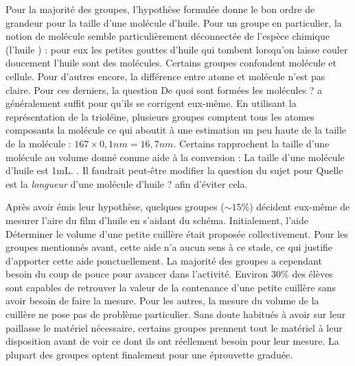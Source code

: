 \documentclass[12pt,a4paper]{article}
\begin{document}
Pour la majorité des groupes, l'hypothèse formulée donne le bon ordre de grandeur pour la taille d'une molécule d'huile.
Pour un groupe en particulier, la notion de molécule semble particulièrement déconnectée de l'espèce chimique (\og l'huile \fg{}) : pour eux les petites gouttes d'huile qui tombent lorsqu'on laisse couler doucement l'huile sont des molécules.
Certains groupes confondent molécule et cellule.
Pour d'autres encore, la différence entre atome et molécule n'est pas claire.
Pour ces derniers, la question \og De quoi sont formées les molécules ? \fg{} a généralement suffit pour qu'ils se corrigent eux-même.
En utilisant la représentation de la trioléine, plusieurs groupes comptent tous les atomes composants la molécule ce qui aboutit à une estimation un peu haute de la taille de la molécule : $167 \times \unit{0{,}1}{nm}=\unit{16{,}7}{nm}$.
Certains rapprochent la taille d'une molécule au volume donné comme aide à la conversion : \og La taille d'une molécule d'huile est \unit{1}{mL}. \fg{}.
Il faudrait peut-être modifier la question du sujet pour \og Quelle est la \emph{longueur} d'une molécule d'huile ? \fg{} afin d'éviter cela. 

Après avoir émis leur hypothèse, quelques groupes ($\sim \unit{15}{\%}$) décident eux-même de mesurer l'aire du film d'huile en s'aidant du schéma.
Initialement, l'aide \og Déterminer le volume d'une petite cuillère \fg{} était proposée collectivement.
Pour les groupes mentionnés avant, cette aide n'a aucun sens à ce stade, ce qui justifie d'apporter cette aide ponctuellement.
La majorité des groupes a cependant besoin du coup de pouce pour avancer dans l'activité.
Environ \unit{30}{\%} des élèves sont capables de retrouver la valeur de la contenance d'une petite cuillère sans avoir besoin de faire la mesure.
Pour les autres, la mesure du volume de la cuillère ne pose pas de problème particulier.
Sans doute habitués à avoir sur leur paillasse le matériel nécessaire, certains groupes prennent tout le matériel à leur disposition avant de voir ce dont ils ont réellement besoin pour leur mesure.
La plupart des groupes optent finalement pour une éprouvette graduée.
\end{document}
